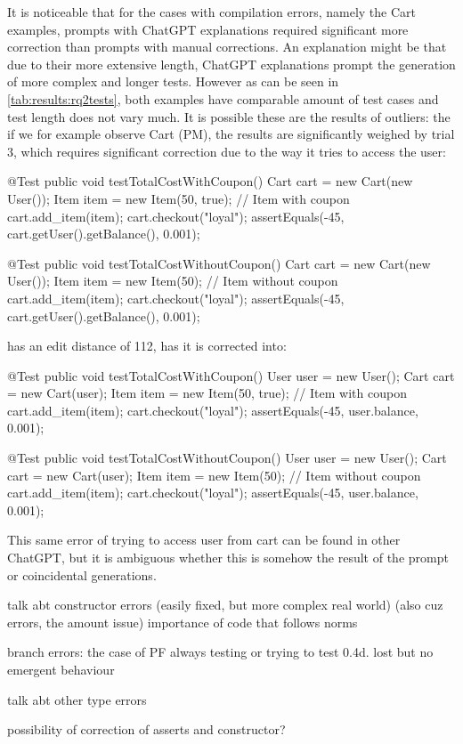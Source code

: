 It is noticeable that for the cases with compilation errors, namely the Cart examples, prompts with ChatGPT explanations
required significant more correction than prompts with manual corrections. An explanation might be that due to their more
extensive length, ChatGPT explanations prompt the generation of more complex and longer tests. However as can be seen in
\cref{tab:results:rq2tests}, both examples have comparable amount of test cases and test length does not vary much.
It is possible these are the results of outliers: the if we for example observe Cart (PM), the results are significantly weighed by
trial 3, which requires significant correction due to the way it tries to access the user:
\begin{answer}
    @Test
    public void testTotalCostWithCoupon() {
        Cart cart = new Cart(new User());
        Item item = new Item(50, true); // Item with coupon
        cart.add_item(item);
        cart.checkout("loyal");
        assertEquals(-45, cart.getUser().getBalance(), 0.001);
    }

    @Test
    public void testTotalCostWithoutCoupon() {
        Cart cart = new Cart(new User());
        Item item = new Item(50); // Item without coupon
        cart.add_item(item);
        cart.checkout("loyal");
        assertEquals(-45, cart.getUser().getBalance(), 0.001);
    }
\end{answer}
has an edit distance of 112, has it is corrected into:
\begin{answer}
    @Test
    public void testTotalCostWithCoupon() {
        User user = new User();
        Cart cart = new Cart(user);
        Item item = new Item(50, true); // Item with coupon
        cart.add_item(item);
        cart.checkout("loyal");
        assertEquals(-45, user.balance, 0.001);
    }

    @Test
    public void testTotalCostWithoutCoupon() {
        User user = new User();
        Cart cart = new Cart(user);
        Item item = new Item(50); // Item without coupon
        cart.add_item(item);
        cart.checkout("loyal");
        assertEquals(-45, user.balance, 0.001);
    }
\end{answer}
This same error of trying to access user from cart can be found in other ChatGPT, but it is ambiguous
whether this is somehow the result of the prompt or coincidental generations.

talk abt constructor errors (easily fixed, but more complex real world)
(also cuz errors, the amount issue)
importance of code that follows norms

branch errors: the case of PF always testing or trying to test 0.4d. lost but no emergent behaviour

talk abt other type errors

possibility of correction of asserts and constructor?